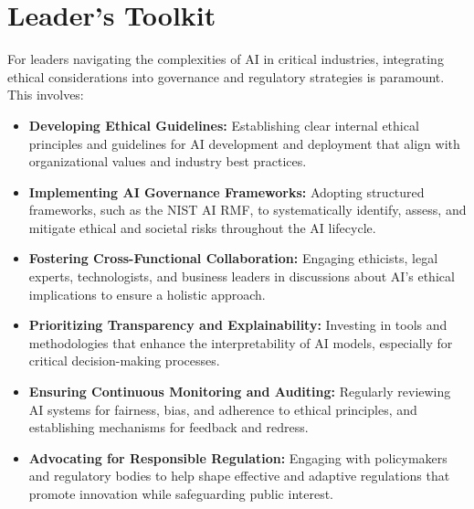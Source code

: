 \section{Leader's Toolkit}
\label{sec:governance_leaders_toolkit}
For leaders navigating the complexities of AI in critical industries, integrating ethical considerations into governance and regulatory strategies is paramount. This involves:
\begin{itemize}
    \item \textbf{Developing Ethical Guidelines:} Establishing clear internal ethical principles and guidelines for AI development and deployment that align with organizational values and industry best practices.
    \item \textbf{Implementing AI Governance Frameworks:} Adopting structured frameworks, such as the NIST AI RMF, to systematically identify, assess, and mitigate ethical and societal risks throughout the AI lifecycle.
    \item \textbf{Fostering Cross-Functional Collaboration:} Engaging ethicists, legal experts, technologists, and business leaders in discussions about AI's ethical implications to ensure a holistic approach.
    \item \textbf{Prioritizing Transparency and Explainability:} Investing in tools and methodologies that enhance the interpretability of AI models, especially for critical decision-making processes.
    \item \textbf{Ensuring Continuous Monitoring and Auditing:} Regularly reviewing AI systems for fairness, bias, and adherence to ethical principles, and establishing mechanisms for feedback and redress.
    \item \textbf{Advocating for Responsible Regulation:} Engaging with policymakers and regulatory bodies to help shape effective and adaptive regulations that promote innovation while safeguarding public interest.
\end{itemize}